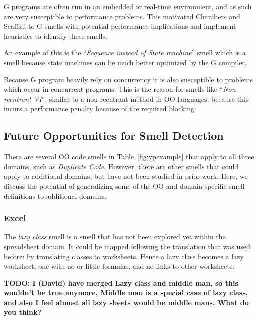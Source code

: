 \documentclass[10pt,conference,compsocconf]{IEEEtran}
\newcommand{\todo}[1]{\textbf{TODO: #1}}
\begin{document}
G programs are often run in an embedded or real-time environment, and as such are very susceptible to performance problems. This motivated Chambers and Scaffidi \cite{chambers2013smell} to G smells with potential performance implications and implement heuristics to identify these smells.

An example of this is the ``\textit{Sequence instead of State machine}'' smell which is a smell because state machines can be much better optimized by the G compiler.

Because G program heavily rely on concurrency it is also susceptible to problems which occur in concurrent programs.
This is the reason for smells like ``\textit{Non-reentrant VI}'', similar to a non-reentrant method in OO-languages, because this incurs a performance penalty because of the required blocking.

\subsection{Future Opportunities for Smell Detection}
\label{subsec:futuresmells}
There are several OO code smells in Table~\ref{fig:ypexample} that apply to all three domains, such as \emph{Duplicate Code}. However, there are other smells that could apply to additional domains, but have not been studied in prior work. Here, we discuss the potential of generalizing some of the OO and domain-specific smell definitions to additional domains. 

\subsubsection{Excel}
The \emph{lazy class} smell is a smell that has not been explored yet within the spreadsheet domain. It could be mapped following the translation that was used before: by translating classes to worksheets. Hence a lazy class becomes a lazy worksheet, one with no or little formulas, and no links to other worksheets.

\todo{I (David) have merged Lazy class and middle man, so this wouldn't be true anymore, Middle man is a special case of lazy class, and also I feel almost all lazy sheets would be middle mans. What do you think?}

\end{document}
